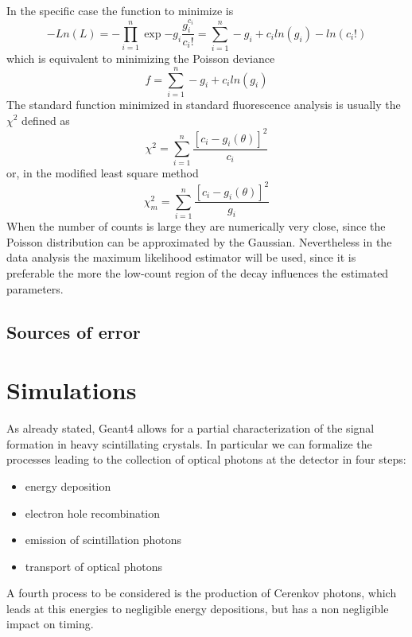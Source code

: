 In the specific case the function to minimize is
\begin{equation}
-Ln(L) = - \prod _{i=1}^{n} \exp{-g_{i}} \frac{g_{i}^{c_i}}{c_{i}!} = \sum _{i=1}^{n} -g_{i} + c_{i}ln(g_{i}) - ln(c_{i}!)
\end{equation}
which is equivalent to minimizing the Poisson deviance\cite{Bajzer1991}
\begin{equation}
f = \sum _{i=1}^{n} -g_{i} + c_{i}ln(g_{i})
\end{equation}
The standard function minimized in standard fluorescence analysis is usually the $\chi ^{2}$ defined as
\begin{equation}
\chi ^{2} = \sum _{i=1}^{n} \frac{\left[ c_{i} - g_{i}(\theta) \right] ^{2}}{c_{i}}
\end{equation}
or, in the modified least square method\cite{Bajzer1991}
\begin{equation}
\chi _{m}^{2} = \sum _{i=1}^{n} \frac{\left[ c_{i} - g_{i}(\theta) \right] ^{2}}{g_{i}}
\end{equation}
When the number of counts is large they are numerically very close, since the Poisson distribution can be approximated by the Gaussian. Nevertheless in the data analysis the maximum likelihood estimator will be used, since it is preferable the more the low-count region of the decay influences the estimated parameters\cite{Bajzer1991}. 

\subsection{Sources of error}


\section{Simulations}

As already stated, Geant4 allows for a partial characterization of the signal formation in heavy scintillating crystals.
In particular we can formalize the processes leading to the collection of optical photons at the detector in four steps:
\begin{itemize}
\item energy deposition
\item electron hole recombination
\item emission of scintillation photons
\item transport of optical photons
\end{itemize}
A fourth process to be considered is the production of Cerenkov photons, which leads at this energies to negligible energy depositions, but has a non negligible impact on timing.

